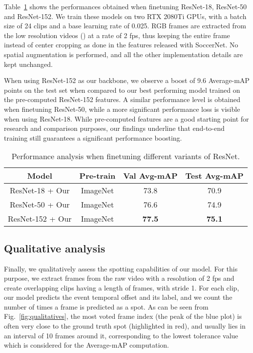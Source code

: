 \documentclass[a4paper,conference]{IEEEtran}
\begin{document}
Table~\ref{tab:e2e} shows the performances obtained when finetuning ResNet-18, ResNet-50 and ResNet-152. We train these models on two RTX 2080Ti GPUs, with a batch size of 24 clips and a base learning rate of 0.025. RGB frames are extracted from the low resolution videos () at a rate of 2 fps, thus keeping the entire frame instead of center cropping as done in the features released with SoccerNet. No spatial augmentation is performed, and all the other implementation details are kept unchanged.

When using ResNet-152 as our backbone, we observe a boost of 9.6 Average-mAP points on the test set when compared to our best performing model trained on the pre-computed ResNet-152 features. A similar performance level is obtained when finetuning ResNet-50, while a more significant performance loss is visible when using ResNet-18. While pre-computed features are a good starting point for research and comparison purposes, our findings underline that end-to-end training still guarantees a significant performance boosting.

\begin{table}[t]
\centering
\caption{Performance analysis when finetuning different variants of ResNet.}
\begin{tabular}{cccc}
    \toprule 
    Model & Pre-train & Val Avg-mAP & Test Avg-mAP \\
    \midrule
    ResNet-18 + Our & ImageNet & 73.8 & 70.9 \\
    ResNet-50 + Our & ImageNet & 76.6 & 74.9 \\
    ResNet-152 + Our & ImageNet & \textbf{77.5} & \textbf{75.1} \\
    \bottomrule
\end{tabular}
\label{tab:e2e}
\end{table}


\subsection{Qualitative analysis}
Finally, we qualitatively assess the spotting capabilities of our model. For this purpose, we extract frames from the raw video with a resolution of 2 fps and create overlapping clips having a length of  frames, with stride 1.
For each clip, our model predicts the event temporal offset and its label, and we count the number of times a frame is predicted as a spot. As can be seen from Fig.~\ref{fig:qualitatives}, the most voted frame index (the peak of the blue plot) is often very close to the ground truth spot (highlighted in red), and usually lies in an interval of 10 frames around it, corresponding to the lowest tolerance value  which is considered for the Average-mAP computation.
\end{document}
